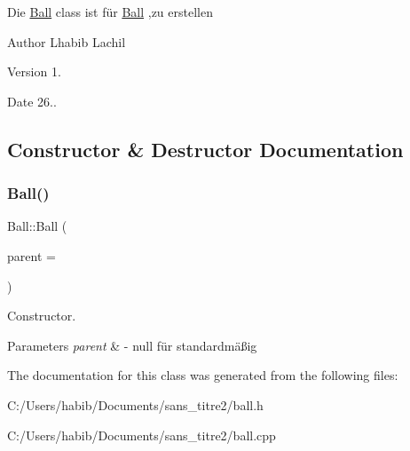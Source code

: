 Die \hyperlink{class_ball}{Ball} class ist für \hyperlink{class_ball}{Ball} ,zu erstellen \begin{DoxyAuthor}{Author}
Lhabib Lachil 
\end{DoxyAuthor}
\begin{DoxyVersion}{Version}
1. 
\end{DoxyVersion}
\begin{DoxyDate}{Date}
26.. 
\end{DoxyDate}


\subsection{Constructor \& Destructor Documentation}
\mbox{\label{class_ball_a773ee84b48270ddae97d29ed218f5d89}} 
\subsubsection{\texorpdfstring{Ball()}{Ball()}}
{\footnotesize\ttfamily Ball\+::\+Ball (\begin{DoxyParamCaption}\item[{Q\+Graphics\+Item $\ast$}]{parent = {} }\end{DoxyParamCaption})}



Constructor. 


\begin{DoxyParams}{Parameters}
{\em parent} & -\/ null für standardmäßig \\
\hline
\end{DoxyParams}


The documentation for this class was generated from the following files\+:\begin{DoxyCompactItemize}
\item 
C\+:/\+Users/habib/\+Documents/sans\+\_\+titre2/ball.\+h\item 
C\+:/\+Users/habib/\+Documents/sans\+\_\+titre2/ball.\+cpp\end{DoxyCompactItemize}
